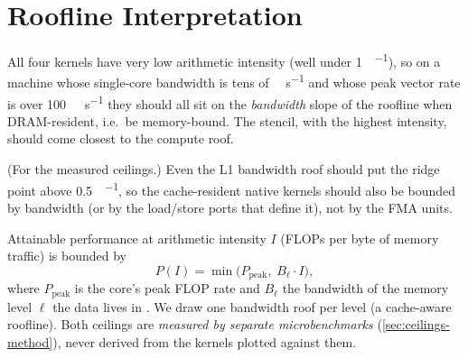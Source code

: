 \section{Roofline Interpretation}\label{sec:roofline}

\begin{hypothesis}
  All four kernels have very low arithmetic intensity (well under \qty{1}{\flop\per\byte}), so on a
  machine whose single-core bandwidth is tens of \unit{\giga\byte\per\second} and whose peak vector
  rate is over \qty{100}{\giga\flop\per\second} they should all sit on the \emph{bandwidth} slope of
  the roofline when DRAM-resident, i.e.\ be memory-bound. The stencil, with the highest intensity,
  should come closest to the compute roof.
\end{hypothesis}
\begin{hypothesis}
  (For the measured ceilings.) Even the L1 bandwidth roof should put the
  ridge point above \qty{0.5}{\flop\per\byte}, so the cache-resident native kernels should also be
  bounded by bandwidth (or by the load/store ports that define it), not by the FMA units.
\end{hypothesis}

Attainable performance at arithmetic intensity $I$ (FLOPs per byte of memory traffic) is bounded by
\begin{equation}
  P(I) = \min\bigl(P_{\text{peak}},\; B_{\ell} \cdot I\bigr),
\end{equation}
where $P_{\text{peak}}$ is the core's peak FLOP rate and $B_{\ell}$ the bandwidth of the memory level
$\ell$ the data lives in \cite{williams2009roofline}. We draw one bandwidth roof per level (a
cache-aware roofline). Both ceilings are \emph{measured by separate microbenchmarks}
(\cref{sec:ceilings-method}), never derived from the kernels plotted against them.

